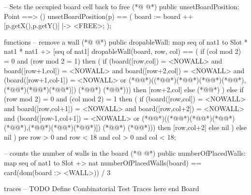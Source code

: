 \begin{vdmpp}[breaklines=true]
  -- Sets the occupied board cell back to free
(*@
\label{unsetBoardPosition:280}
@*)
  public unsetBoardPosition: Point ==> ()
  unsetBoardPosition(p) ==
  (
   board := board ++ {[p.getX(),p.getY()]  |-> <FREE>}; 
  );
  
  
functions
  -- remove a wall
(*@
\label{dropableWall:289}
@*)
  public dropableWall: map seq of nat1 to Slot * nat1 * nat1 +> [seq of nat1]
  dropableWall(board, row, col) == 
  (
   if (col mod 2) = 0 and (row mod 2 = 1)
   then (
    if (board([row,col]) = <NOWALL> and board([row+1,col]) = <NOWALL> and board([row+2,col]) = <NOWALL> and (board([row+1,col-1]) = <NOWALL> or (*@@*)((*@\vdmnotcovered{[}@*)(*@@*)(*@\vdmnotcovered{+}@*)(*@@*),(*@@*)(*@\vdmnotcovered{+}@*)(*@@*)]) (*@\vdmnotcovered{=}@*) (*@@*))) 
    then [row+2,col]
    else (*@@*)
   )
   else 
   if (row mod 2) = 0 and (col mod 2) = 1
   then (
    if (board([row,col]) = <NOWALL> and board([row,col+1]) = <NOWALL> and board([row,col+2]) = <NOWALL> and (board([row-1,col+1]) = <NOWALL> or (*@@*)((*@\vdmnotcovered{[}@*)(*@@*)(*@\vdmnotcovered{+}@*)(*@@*),(*@@*)(*@\vdmnotcovered{+}@*)(*@@*)]) (*@\vdmnotcovered{=}@*) (*@@*)))
    then [row,col+2]
    else nil
   )
   else nil
  )
  pre row > 0 and row < 18 and col > 0 and col < 18;
  
  -- counts the number of walls in the board
(*@
\label{numberOfPlacedWalls:310}
@*)
  public numberOfPlacedWalls: map seq of nat1 to Slot +> nat
  numberOfPlacedWalls(board) ==
  card(dom(board :> {<WALL>})) / 3
 
traces
-- TODO Define Combinatorial Test Traces here  
end Board
\end{vdmpp}
\bigskip
